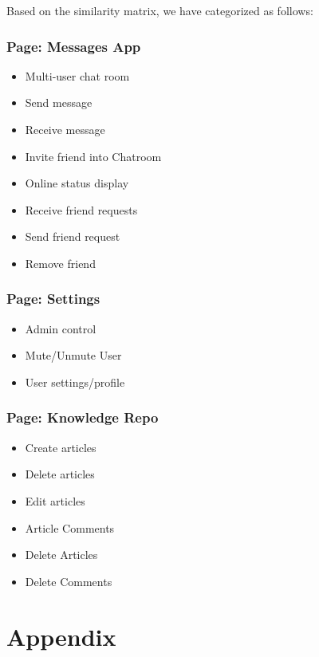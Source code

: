 \documentclass[12pt]{article}
\begin{document}
\newpage

Based on the similarity matrix, we have categorized as follows:
\begin{multicols}{2}

\subsubsection*{Page: Messages App}
\begin{itemize}
    \item Multi-user chat room
    \item Send message
    \item Receive message
    \item Invite friend into Chatroom
    \item Online status display
    \item Receive friend requests
    \item Send friend request
    \item Remove friend
\end{itemize}

\subsubsection*{Page: Settings}
\begin{itemize}
    \item Admin control
    \item Mute/Unmute User
    \item User settings/profile
\end{itemize}

\columnbreak

\subsubsection*{Page: Knowledge Repo}
\begin{itemize}
    \item Create articles
    \item Delete articles
    \item Edit articles
    \item Article Comments
    \item Delete Articles
    \item Delete Comments
\end{itemize}

\end{multicols}

\section{Appendix}
\end{document}

